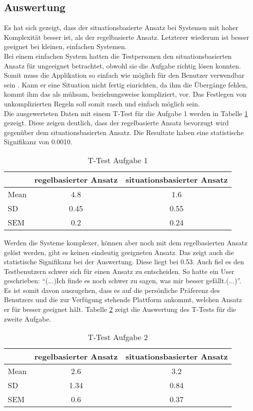 \subsection{Auswertung}
Es hat sich gezeigt, dass der situationsbasierte Ansatz bei Systemen mit hoher Komplexität besser ist, als der regelbasierte Ansatz. Letzterer wiederum ist besser geeignet bei kleinen, einfachen Systemen.\\
Bei einem einfachen System hatten die Testpersonen den situationsbasierten Ansatz für ungeeignet betrachtet, obwohl sie die Aufgabe richtig lösen konnten. Somit muss die Applikation so einfach wie möglich für den Benutzer verwendbar sein \cite{ifttt}. Kann er eine Situation nicht fertig einrichten, da ihm die Übergänge fehlen, kommt ihm das als mühsam, beziehungsweise kompliziert, vor. Das Festlegen von unkomplizierten Regeln soll somit rasch und einfach möglich sein.\\
Die ausgewerteten Daten mit einem T-Test für die Aufgabe 1 werden in Tabelle \ref{tab:auf1} gezeigt. Diese zeigen deutlich, dass der regelbasierte Ansatz bevorzugt wird gegenüber dem situationsbasierten Ansatz.  Die Resultate haben eine statistische Signifikanz von 0.0010.\\[2ex]
\begin{table}[h]
\centering
\begin{tabular}{@{} l | c | c @{}}
 & regelbasierter Ansatz & situationsbasierter Ansatz \\ \hline
 Mean & 4.8  & 1.6  \\ \hline
 SD & 0.45  & 0.55  \\ \hline
 SEM & 0.2  & 0.24  \\ \midrule
 \end{tabular}
\caption{\label{tab:auf1}T-Test Aufgabe 1}
\end{table}

Werden die Systeme komplexer, können aber noch mit dem regelbasierten Ansatz gelöst werden, gibt es keinen eindeutig geeigneten Ansatz. Das zeigt auch die statistische Signifikanz bei der Auswertung. Diese liegt bei 0.53. Auch fiel es den Testbenutzern schwer sich für einen Ansatz zu entscheiden. So hatte ein User geschrieben: \enquote{(...)Ich finde es noch schwer zu sagen, was mir besser gefällt.(...)}. Es ist somit davon auszugehen, dass es auf die persönliche Präferenz des Benutzers und die zur Verfügung stehende Plattform ankommt, welchen Ansatz er für besser geeignet hält\cite{gut}. Tabelle \ref{tab:auf2} zeigt die Auswertung des T-Tests für die zweite Aufgabe.\\[2ex]
\begin{table}[h]
\centering
\begin{tabular}{@{} l | c | c @{}}
 & regelbasierter Ansatz & situationsbasierter Ansatz  \\ \hline
 Mean & 2.6  & 3.2  \\ \hline
 SD & 1.34  & 0.84  \\ \hline
 SEM & 0.6  & 0.37  \\ \midrule
 \end{tabular}
\caption{\label{tab:auf2}T-Test Aufgabe 2}
\end{table}

